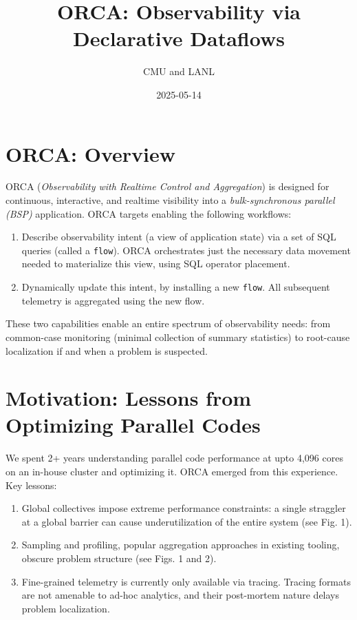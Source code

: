\documentclass[
  letterpaper,
  DIV=11,
  numbers=noendperiod]{scrartcl}
\title{ORCA: Observability via Declarative Dataflows}
\author{CMU and LANL}
\date{2025-05-14}
\providecommand{\tightlist}{%
  \setlength{\itemsep}{0pt}\setlength{\parskip}{0pt}}\usepackage{longtable,booktabs,array}
\begin{document}
\maketitle


\section{ORCA: Overview}\label{orca-overview}

ORCA (\emph{Observability with Realtime Control and Aggregation}) is
designed for continuous, interactive, and realtime visibility into a
\emph{bulk-synchronous parallel (BSP)} application. ORCA targets
enabling the following workflows:

\begin{enumerate}
\def\labelenumi{\arabic{enumi}.}
\tightlist
\item
  Describe observability intent (a view of application state) via a set
  of SQL queries (called a \texttt{flow}). ORCA orchestrates just the
  necessary data movement needed to materialize this view, using SQL
  operator placement.
\item
  Dynamically update this intent, by installing a new \texttt{flow}. All
  subsequent telemetry is aggregated using the new flow.
\end{enumerate}

These two capabilities enable an entire spectrum of observability needs:
from common-case monitoring (minimal collection of summary statistics)
to root-cause localization if and when a problem is suspected.

\section{Motivation: Lessons from Optimizing Parallel
Codes}\label{motivation-lessons-from-optimizing-parallel-codes}

We spent 2+ years understanding parallel code performance at upto 4,096
cores on an in-house cluster and optimizing it. ORCA emerged from this
experience. Key lessons:

\begin{enumerate}
\def\labelenumi{\arabic{enumi}.}
\item
  Global collectives impose extreme performance constraints: a single
  straggler at a global barrier can cause underutilization of the entire
  system (see Fig. 1).
\item
  Sampling and profiling, popular aggregation approaches in existing
  tooling, obscure problem structure (see Figs. 1 and 2).
\item
  Fine-grained telemetry is currently only available via tracing.
  Tracing formats are not amenable to ad-hoc analytics, and their
  post-mortem nature delays problem localization.

  \newpage
\end{enumerate}
\end{document}
